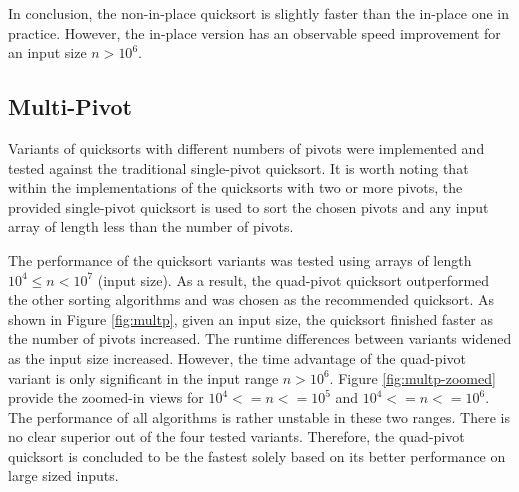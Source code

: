 \documentclass[titlepage, 12pt]{article}
\begin{document}
In conclusion, the non-in-place quicksort is slightly faster than the in-place
one in practice. However, the in-place version has an observable speed
improvement for an input size \( n > 10^6 \).

\subsection{Multi-Pivot}

Variants of quicksorts with different numbers of pivots were implemented and
tested against the traditional single-pivot quicksort. It is worth noting that
within the implementations of the quicksorts with two or more pivots, the
provided single-pivot quicksort is used to sort the chosen pivots and any input
array of length less than the number of pivots.

The performance of the quicksort variants was tested using arrays of length \(
10^4 \leq n < 10^7 \) (input size). As a result, the quad-pivot quicksort
outperformed the other sorting algorithms and was chosen as the recommended
quicksort. As shown in Figure \ref{fig:multp}, given an input size, the
quicksort finished faster as the number of pivots increased. The runtime
differences between variants widened as the input size increased. However, the
time advantage of the quad-pivot variant is only significant in the input range
\( n > 10^6 \). Figure \ref{fig:multp-zoomed} provide the zoomed-in views for \(
10^4 <= n <= 10^5 \) and \( 10^4 <= n <= 10^6 \). The performance of all
algorithms is rather unstable in these two ranges. There is no clear superior
out of the four tested variants. Therefore, the quad-pivot quicksort is
concluded to be the fastest solely based on its better performance on large
sized inputs.
\end{document}
